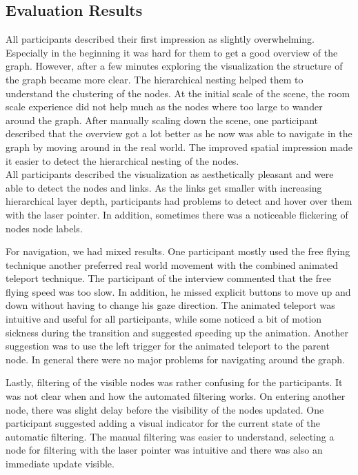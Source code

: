 \subsection{Evaluation Results}

All participants described their first impression as slightly overwhelming.
Especially in the beginning it was hard for them to get a good overview of the graph.
However, after a few minutes exploring the visualization the structure of the graph became more clear.
The hierarchical nesting helped them to understand the clustering of the nodes.
At the initial scale of the scene, the room scale experience did not help much as the nodes where too large to wander around the graph. 
After manually scaling down the scene, one participant described that the overview got a lot better as he now was able to navigate in the graph by moving around in the real world. 
The improved spatial impression made it easier to detect the hierarchical nesting of the nodes.
\\
All participants described the visualization as aesthetically pleasant and were able to detect the nodes and links. As the links get smaller with increasing hierarchical layer depth, participants had problems to detect and hover over them with the laser pointer.
In addition, sometimes there was a noticeable flickering of nodes node labels.  

For navigation, we had mixed results. One participant mostly used the free flying technique another preferred real world movement with the combined animated teleport technique.
The participant of the interview commented that the free flying speed was too slow. In addition, he missed explicit buttons to move up and down without having to change his gaze direction.
The animated teleport was intuitive and useful for all participants, while some noticed a bit of motion sickness during the transition and suggested speeding up the animation. Another suggestion was to use the left trigger for the animated teleport to the parent node.   
In general there were no major problems for navigating around the graph. 

Lastly, filtering of the visible nodes was rather confusing for the participants. It was not clear when and how the automated filtering works. On entering another node, there was slight delay before the visibility of the nodes updated.
One participant suggested adding a visual indicator for the current state of the automatic filtering.
The manual filtering was easier to understand, selecting a node for filtering with the laser pointer was intuitive and there was also an immediate update visible.

